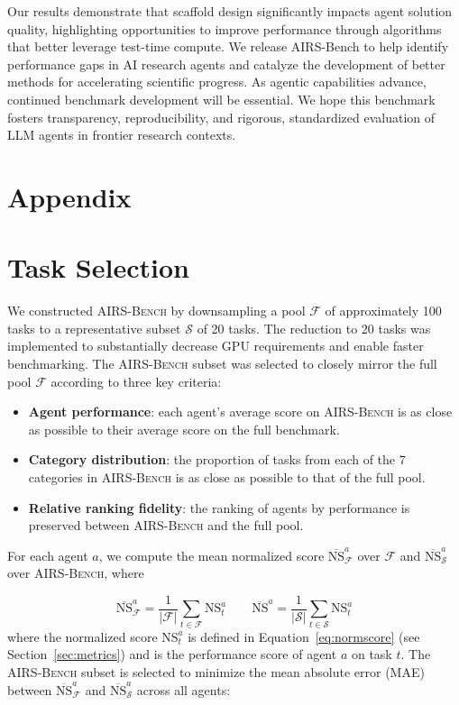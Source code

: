 \documentclass{fairmeta}
\newcommand{\airsbench}{\textsc{AIRS-Bench}}
\begin{document}
Our results demonstrate that scaffold design significantly impacts agent solution quality, highlighting opportunities to improve performance through algorithms that better leverage test-time compute. We release AIRS-Bench to help identify performance gaps in AI research agents and catalyze the development of better methods for accelerating scientific progress. As agentic capabilities advance, continued benchmark development will be essential. We hope this benchmark fosters transparency, reproducibility, and rigorous, standardized evaluation of LLM agents in frontier research contexts.



\newpage
\appendix
\section*{Appendix}

\section{Task Selection}
\label{sec:selection-process}


We constructed \airsbench{} by downsampling a pool $\mathcal{F}$ of approximately 100 tasks to a representative subset $\mathcal{S}$ of 20 tasks. The reduction to 20 tasks was implemented to substantially decrease GPU requirements and enable faster benchmarking. The \airsbench{} subset was selected to closely mirror the full pool $\mathcal{F}$ according to three key criteria:
\begin{itemize}
    \item \textbf{Agent performance}: each agent's average score on \airsbench{} is as close as possible to their average score on the full benchmark.
    \item \textbf{Category distribution}: the proportion of tasks from each of the 7 categories in \airsbench{} is as close as possible to that of the full pool.
    \item \textbf{Relative ranking fidelity}: the ranking of agents by performance is preserved between \airsbench{} and the full pool.
\end{itemize}

For each agent $a$, we compute the mean normalized score $\overline{\text{NS}}_\mathcal{F}^a$ over $\mathcal{F}$ and $\overline{\text{NS}}^a_{\mathcal{S}}$ over \airsbench{}, where

\begin{equation}
    \overline{\text{NS}}^a_{\mathcal{F}} = \frac{1}{|\mathcal{F}|}\sum_{t \in \mathcal{F}} \text{NS}_t^a \qquad
    \overline{\text{NS}}^a = \frac{1}{|\mathcal{S}|}\sum_{t \in \mathcal{S}} \text{NS}_t^a
\end{equation} where the normalized score $\text{NS}_t^a$ is defined in Equation~\ref{eq:normscore} (see Section~\ref{sec:metrics}) and is the performance score of agent $a$ on task $t$. The \airsbench{} subset is selected to minimize the mean absolute error (MAE) between $\overline{\text{NS}}^a_\mathcal{F}$ and $\overline{\text{NS}}^a_{\mathcal{S}}$ across all agents:
\end{document}
